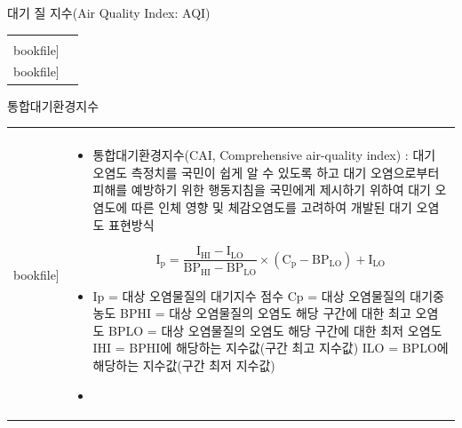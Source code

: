 \begin{frame}[t]{대기 질 지수(Air Quality Index: AQI)}
	\begin{tabular}{ll}
		\begin{minipage}[t]{0.475\textwidth}\scriptsize
			\begin{figure}[t]
				\texttt{[image: \\bookfile]}
			\end{figure}
		\end{minipage}	
		&
		\begin{minipage}[t]{0.475\textwidth} \scriptsize	
			\begin{figure}[t]
				\texttt{[image: \\bookfile]}
			\end{figure}
		\end{minipage}
	\end{tabular}
\end{frame}




\begin{frame}[t]{통합대기환경지수}
	\begin{tabular}{ll}
		\begin{minipage}[t]{0.2\textwidth}\scriptsize
			\begin{figure}[t]
				\texttt{[image: \\bookfile]}
			\end{figure}
		\end{minipage}	
		&
		\begin{minipage}[t]{0.75\textwidth} \scriptsize	
			\begin{itemize}
				\item 통합대기환경지수(CAI, Comprehensive air-quality index) : 대기 오염도 측정치를 국민이 쉽게 알 수 있도록 하고 대기 오염으로부터 피해를 예방하기 위한 행동지침을 국민에게 제시하기 위하여 대기 오염도에 따른 인체 영향 및 체감오염도를 고려하여 개발된 대기 오염도 표현방식
				
				$$
				\mathrm{I}_{\mathrm{p}}=\frac{\mathrm{I}_{\mathrm{HI}}-\mathrm{I}_{\mathrm{LO}}}{\mathrm{BP}_{\mathrm{HI}}-\mathrm{BP}_{\mathrm{LO}}} \times\left(\mathrm{C}_{\mathrm{p}}-\mathrm{BP}_{\mathrm{LO}}\right)+\mathrm{I}_{\mathrm{LO}}
				$$

				\item Ip = 대상 오염물질의 대기지수 점수
				Cp = 대상 오염물질의 대기중 농도
				BPHI = 대상 오염물질의 오염도 해당 구간에 대한 최고 오염도
				BPLO = 대상 오염물질의 오염도 해당 구간에 대한 최저 오염도
				IHI = BPHI에 해당하는 지수값(구간 최고 지수값)
				ILO = BPLO에 해당하는 지수값(구간 최저 지수값)
				
				\item 
				
			\end{itemize}

		\end{minipage}
	\end{tabular}
\end{frame}



